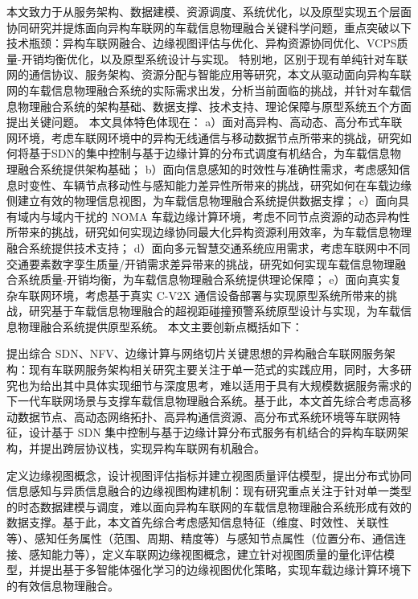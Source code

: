 本文致力于从服务架构、数据建模、资源调度、系统优化，以及原型实现五个层面协同研究并提炼面向异构车联网的车载信息物理融合关键科学问题，重点突破以下技术瓶颈：异构车联网融合、边缘视图评估与优化、异构资源协同优化、VCPS质量-开销均衡优化，以及原型系统设计与实现。
特别地，区别于现有单纯针对车联网的通信协议、服务架构、资源分配与智能应用等研究，本文从驱动面向异构车联网的车载信息物理融合系统的实际需求出发，分析当前面临的挑战，并针对车载信息物理融合系统的架构基础、数据支撑、技术支持、理论保障与原型系统五个方面提出关键问题。
本文具体特色体现在：
a）面对高异构、高动态、高分布式车联网环境，考虑车联网环境中的异构无线通信与移动数据节点所带来的挑战，研究如何将基于SDN的集中控制与基于边缘计算的分布式调度有机结合，为车载信息物理融合系统提供架构基础；
b）面向信息感知的时效性与准确性需求，考虑感知信息时变性、车辆节点移动性与感知能力差异性所带来的挑战，研究如何在车载边缘侧建立有效的物理信息视图，为车载信息物理融合系统提供数据支撑；
c）面向具有域内与域内干扰的 NOMA 车载边缘计算环境，考虑不同节点资源的动态异构性所带来的挑战，研究如何实现边缘协同最大化异构资源利用效率，为车载信息物理融合系统提供技术支持；
d）面向多元智慧交通系统应用需求，考虑车联网中不同交通要素数字孪生质量/开销需求差异带来的挑战，研究如何实现车载信息物理融合系统质量-开销均衡，为车载信息物理融合系统提供理论保障；
e）面向真实复杂车联网环境，考虑基于真实 C-V2X 通信设备部署与实现原型系统所带来的挑战，研究基于车载信息物理融合的超视距碰撞预警系统原型设计与实现，为车载信息物理融合系统提供原型系统。
本文主要创新点概括如下：

 提出综合 SDN、NFV、边缘计算与网络切片关键思想的异构融合车联网服务架构：现有车联网服务架构相关研究主要关注于单一范式的实践应用，同时，大多研究也为给出其中具体实现细节与深度思考，难以适用于具有大规模数据服务需求的下一代车联网场景与支撑车载信息物理融合系统。基于此，本文首先综合考虑高移动数据节点、高动态网络拓扑、高异构通信资源、高分布式系统环境等车联网特征，设计基于 SDN 集中控制与基于边缘计算分布式服务有机结合的异构车联网架构，并提出跨层协议栈，实现异构车联网有机融合。

 定义边缘视图概念，设计视图评估指标并建立视图质量评估模型，提出分布式协同信息感知与异质信息融合的边缘视图构建机制：现有研究重点关注于针对单一类型的时态数据建模与调度，难以面向异构车联网的车载信息物理融合系统形成有效的数据支撑。基于此，本文首先综合考虑感知信息特征（维度、时效性、关联性等）、感知任务属性（范围、周期、精度等）与感知节点属性（位置分布、通信连接、感知能力等），定义车联网边缘视图概念，建立针对视图质量的量化评估模型，并提出基于多智能体强化学习的边缘视图优化策略，实现车载边缘计算环境下的有效信息物理融合。

